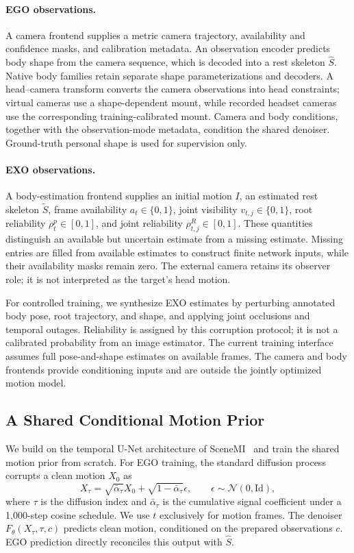 \paragraph{EGO observations.}
A camera frontend supplies a metric camera trajectory, availability and confidence masks, and calibration metadata. An observation encoder predicts body shape from the camera sequence, which is decoded into a rest skeleton $\widehat S$. Native body families retain separate shape parameterizations and decoders. A head--camera transform converts the camera observations into head constraints; virtual cameras use a shape-dependent mount, while recorded headset cameras use the corresponding training-calibrated mount. Camera and body conditions, together with the observation-mode metadata, condition the shared denoiser. Ground-truth personal shape is used for supervision only.

\paragraph{EXO observations.}
A body-estimation frontend supplies an initial motion $I$, an estimated rest skeleton $\widetilde S$, frame availability $a_t\in\{0,1\}$, joint visibility $v_{t,j}\in\{0,1\}$, root reliability $\rho^p_t\in[0,1]$, and joint reliability $\rho^R_{t,j}\in[0,1]$. These quantities distinguish an available but uncertain estimate from a missing estimate. Missing entries are filled from available estimates to construct finite network inputs, while their availability masks remain zero. The external camera retains its observer role; it is not interpreted as the target's head motion.

For controlled training, we synthesize EXO estimates by perturbing annotated body pose, root trajectory, and shape, and applying joint occlusions and temporal outages. Reliability is assigned by this corruption protocol; it is not a calibrated probability from an image estimator. The current training interface assumes full pose-and-shape estimates on available frames. The camera and body frontends provide conditioning inputs and are outside the jointly optimized motion model.

\subsection{A Shared Conditional Motion Prior}
\label{sec:prior}

We build on the temporal U-Net architecture of SceneMI~\cite{hwang2025scenemi} and train the shared motion prior from scratch. For EGO training, the standard diffusion process~\cite{ho2020ddpm} corrupts a clean motion $X_0$ as
\begin{equation}
X_\tau=\sqrt{\bar\alpha_\tau}X_0+
       \sqrt{1-\bar\alpha_\tau}\epsilon,\qquad
\epsilon\sim\mathcal N(0,\mathrm{Id}),
\label{eq:forward}
\end{equation}
where $\tau$ is the diffusion index and $\bar\alpha_\tau$ is the cumulative signal coefficient under a 1,000-step cosine schedule. We use $t$ exclusively for motion frames. The denoiser $F_\theta(X_\tau,\tau,c)$ predicts clean motion, conditioned on the prepared observations $c$. EGO prediction directly reconciles this output with $\widehat S$.

